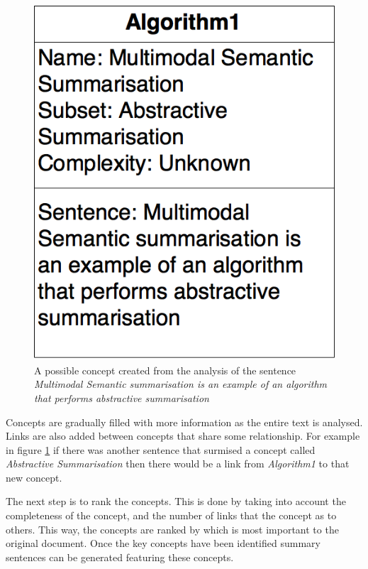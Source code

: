 \documentclass[12pt]{article}
\begin{document}
\begin{figure}[ht!]
  \centering
    \includegraphics[scale=0.3]{MultimodalSummarisation.png}
   \caption[A concept created during multimodal semantic summarisation]{A possible concept created from the analysis of the sentence \emph{Multimodal Semantic summarisation is an example of an algorithm that performs abstractive summarisation}}
   \label{multimodalSummarisation}
\end{figure}

Concepts are gradually filled with more information as the entire text is analysed. Links are also added between concepts that share some relationship. For example in figure \ref{multimodalSummarisation} if there was another sentence that surmised a concept called \emph{Abstractive Summarisation} then there would be a link from \emph{Algorithm1} to that new concept. 

The next step is to rank the concepts. This is done by taking into account the completeness of the concept, and the number of links that the concept as to others. This way, the concepts are ranked by which is most important to the original document. Once the key concepts have been identified summary sentences can be generated featuring these concepts. \\
\end{document}
